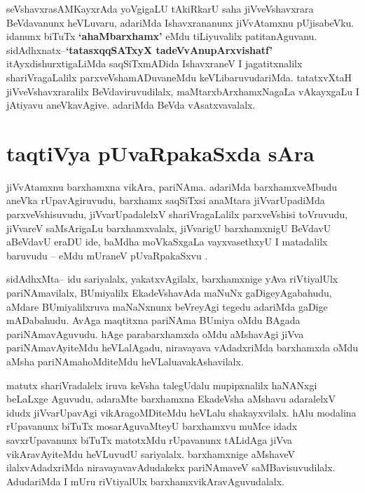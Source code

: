 \begin{artha}
seVshavxrasAMKayxrAda yoVgigaLU tAkiRkarU saha jiVveVshavxrara
BeVdavanunx heVLuvaru, adariMda Ishavxrananunx jiVvAtamxnu
pUjisabeVku. idanunx biTuTx \textbf{`ahaMbarxhamx'} eMdu tiLiyuvalilx
patitanAguvanu. sidAdhxnatx--\textbf{`tatasxqqSATxyX tadeVvAnupArxvishatf'}
itAyxdishurxtigaLiMda saqSiTxmADida IshavxraneV I jagatitxnalilx
shariVragaLalilx parxveVshamADuvaneMdu keVLibaruvudariMda. tatatxvXtaH
jiVveVshavxraralilx BeVdaviruvudilalx, maMtarxbArxhamxNagaLa
vAkayxgaLu I jAtiyavu aneVkavAgive. adariMda BeVda vAsatxvavalalx. 
\end{artha}

\section*{taqtiVya pUvaRpakaSxda sAra}

\begin{artha}
jiVvAtamxnu barxhamxna vikAra, pariNAma. adariMda barxhamxveMbudu aneVka rUpavAgiruvudu, barxhamx saqSiTxsi anaMtara jiVvarUpadiMda parxveVshisuvudu, jiVvarUpadalelxV shariVragaLalilx parxveVshisi toVruvudu, jiVvareV  saMsArigaLu barxhamxvalalx, jiVvarigU barxhamxnigU BeVdavU aBeVdavU eraDU ide, baMdha moVkaSxgaLa vayxvasethxyU I matadalilx baruvudu -- eMdu mUraneV pUvaRpakaSxvu .
\end{artha}

\begin{artha}
sidAdhxMta-- idu sariyalalx, yakatxvAgilalx, barxhamxnige yAva
riVtiyalUlx  pariNAmavilalx, BUmiyalilx EkadeVshavAda maNuNx
gaDigeyAgabahudu, aMdare BUmiyalilxruva maNaNxnunx beVreyAgi tegedu
adariMda gaDige mADabahudu. AvAga maqtitxna pariNAma BUmiya oMdu
BAgada pariNAmavAguvudu. hAge parabarxhamxda oMdu aMshavAgi jiVva
pariNAmavAyiteMdu heVLalAgadu, niravayava vAdadxriMda barxhamxda oMdu
aMsha pariNAmahoMditeMdu heVLaluavakAshavilalx.
\end{artha}

\begin{artha}
matutx shariVradalelx iruva keVsha talegUdalu mupipxnalilx haNANxgi
beLaLxge Aguvudu, adaraMte  barxhamxna EkadeVsha aMshavu adaralelxV
idudx jiVvarUpavAgi vikAragoMDiteMdu heVLalu shakayxvilalx. hAlu
modalina rUpavanunx biTuTx mosarAguvaMteyU barxhamxvu muMce idadx
savxrUpavanunx biTuTx matotxMdu rUpavanunx tALidAga jiVva
vikAravAyiteMdu heVLuvudU sariyalalx. barxhamxnige aMshaveV
ilalxvAdadxriMda niravayavavAdudakekx pariNAmaveV saMBavisuvudilalx.
AdudariMda I mUru riVtiyalUlx barxhamxvikAravAguvudalalx.
\end{artha}

